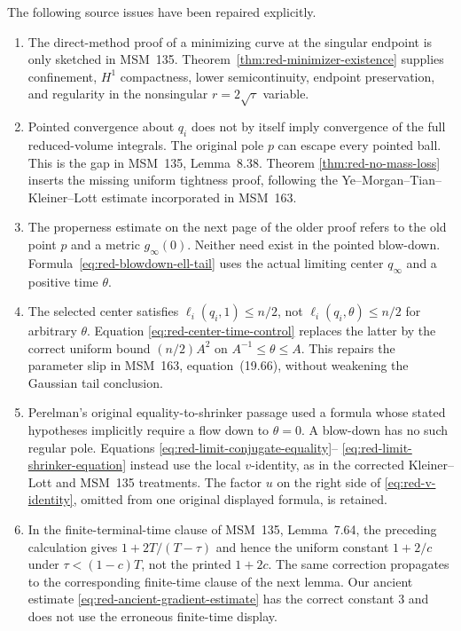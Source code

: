 \documentclass[10pt]{coll-l}
\theoremstyle{definition}
\theoremstyle{remark}
\numberwithin{section}{chapter}
\numberwithin{equation}{chapter}
\begin{document}
The following source issues have been repaired explicitly.
\begin{enumerate}
\item The direct-method proof of a minimizing curve at the singular endpoint
      is only sketched in MSM~135.  Theorem~\ref{thm:red-minimizer-existence}
      supplies confinement, $H^1$ compactness, lower semicontinuity, endpoint
      preservation, and regularity in the nonsingular $r=2\sqrt\tau$
      variable.

\item Pointed convergence about $q_i$ does not by itself imply convergence
      of the full reduced-volume integrals.  The original pole $p$ can escape
      every pointed ball.  This is the gap in MSM~135, Lemma~8.38.  Theorem
      \ref{thm:red-no-mass-loss} inserts the missing uniform tightness proof,
      following the Ye--Morgan--Tian--Kleiner--Lott estimate incorporated in
      MSM~163.

\item The properness estimate on the next page of the older proof refers to
      the old point $p$ and a metric $g_\infty(0)$.  Neither need exist in
      the pointed blow-down.  Formula~\eqref{eq:red-blowdown-ell-tail} uses
      the actual limiting center $q_\infty$ and a positive time $\theta$.

\item The selected center satisfies $\ell_i(q_i,1)\leq n/2$, not
      $\ell_i(q_i,\theta)\leq n/2$ for arbitrary $\theta$.  Equation
      \eqref{eq:red-center-time-control} replaces the latter by the correct
      uniform bound $(n/2)A^2$ on $A^{-1}\leq\theta\leq A$.  This repairs the
      parameter slip in MSM~163, equation~(19.66), without weakening the
      Gaussian tail conclusion.

\item Perelman's original equality-to-shrinker passage used a formula whose
      stated hypotheses implicitly require a flow down to $\theta=0$.
      A blow-down has no such regular pole.  Equations
      \eqref{eq:red-limit-conjugate-equality}--
      \eqref{eq:red-limit-shrinker-equation} instead use the local
      $v$-identity, as in the corrected Kleiner--Lott and MSM~135 treatments.
      The factor $u$ on the right side of \eqref{eq:red-v-identity}, omitted
      from one original displayed formula, is retained.

\item In the finite-terminal-time clause of MSM~135, Lemma~7.64, the
      preceding calculation gives $1+2T/(T-\tau)$ and hence the uniform
      constant $1+2/c$ under $\tau<(1-c)T$, not the printed $1+2c$.  The same
      correction propagates to the corresponding finite-time clause of the
      next lemma.  Our ancient estimate
      \eqref{eq:red-ancient-gradient-estimate} has the correct constant $3$
      and does not use the erroneous finite-time display.


\end{enumerate}
\end{document}
